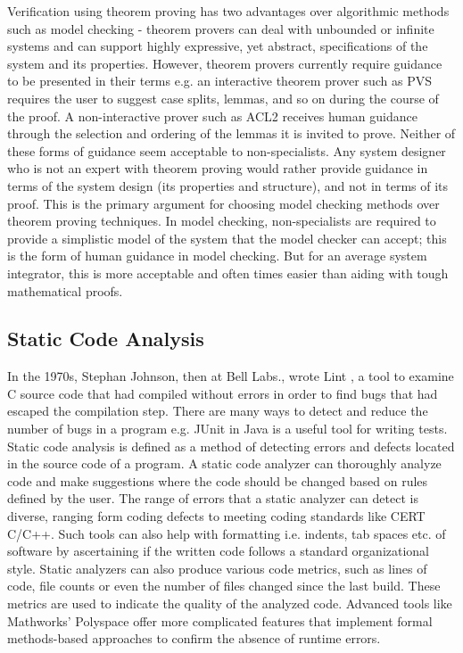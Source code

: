 Verification using theorem proving has two advantages over algorithmic methods such as model checking - theorem provers can deal with unbounded or infinite systems and can support highly expressive, yet abstract, specifications of the system and its properties. However, theorem provers currently require guidance to be presented in their terms e.g. an interactive theorem prover such as PVS \cite{owre1992pvs} requires the user to suggest case splits, lemmas, and so on during the course of the proof. A non-interactive prover such as ACL2 \cite{shelleyacl2} receives human guidance through the selection and ordering of the lemmas it is invited to prove. Neither of these forms of guidance seem acceptable to non-specialists. Any system designer who is not an expert with theorem proving would rather provide guidance in terms of the system design (its properties and structure), and not in terms of its proof. This is the primary argument for choosing model checking methods over theorem proving techniques. In model checking, non-specialists are required to provide a simplistic model of the system that the model checker can accept; this is the form of human guidance in model checking. But for an average system integrator, this is more acceptable and often times easier than aiding with tough mathematical proofs.

\subsection{Static Code Analysis}

In the 1970s, Stephan Johnson, then at Bell Labs., wrote Lint \cite{johnson1977lint}, a tool to examine C source code that had compiled without errors in order to find bugs that had escaped the compilation step. There are many ways to detect and reduce the number of bugs in a program e.g. JUnit \cite{massol2003junit} in Java is a useful tool for writing tests. Static code analysis \cite{Static_Code_Analysis} is defined as a method of detecting errors and defects located in the source code of a program. A static code analyzer can thoroughly analyze code and make suggestions where the code should be changed based on rules defined by the user. The range of errors that a static analyzer can detect is diverse, ranging form coding defects to meeting coding standards like CERT C/C++. Such tools can also help with formatting i.e. indents, tab spaces etc. of software by ascertaining if the written code follows a standard organizational style. Static analyzers can also produce various code metrics, such as lines of code, file counts or even the number of files changed since the last build. These metrics are used to indicate the quality of the analyzed code. Advanced tools like Mathworks' Polyspace \cite{abrahammathworks} offer more complicated features that implement formal methods-based approaches to confirm the absence of runtime errors. 

